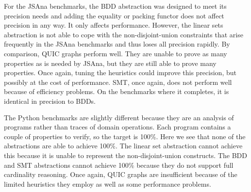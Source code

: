 For the JSAna benchmarks, the BDD abstraction was designed to meet its precision needs and adding the equality or packing functor does not affect precision in any way.  It only affects performance.  However, the linear sets abstraction is not able to cope with the non-disjoint-union constraints that arise frequently in the JSAna benchmarks and thus loses all precision rapidly.  By comparison, QUIC graphs perform well.  They are unable to prove as many properties as is needed by JSAna, but they are still able to prove many properties.  Once again, tuning the heuristics could improve this precision, but possibly at the cost of performance.  SMT, once again, does not perform well because of efficiency problems.  On the benchmarks where it completes, it is identical in precision to BDDs.

The Python benchmarks are slightly different because they are an analysis of programs rather than traces of domain operations.  Each program contains a couple of properties to verify, so the target is 100\%.  Here we see that none of the abstractions are able to achieve 100\%.  The linear set abstraction cannot achieve this because it is unable to represent the non-disjoint-union constructs.  The BDD and SMT abstractions cannot achieve 100\% because they do not support full cardinality reasoning.  Once again, QUIC graphs are insufficient because of the limited heuristics they employ as well as some performance problems.

